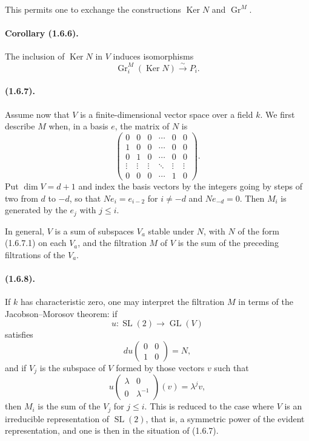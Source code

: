 \documentclass[11pt]{article}
\theoremstyle{remark}
\newcommand{\Gr}{\operatorname{Gr}}
\newcommand{\GL}{\operatorname{GL}}
\newcommand{\Ker}{\operatorname{Ker}}
\begin{document}
This permits one to exchange the constructions $\Ker N$ and $\Gr^M$.

\paragraph{Corollary (1.6.6).}
The inclusion of $\Ker N$ in $V$ induces isomorphisms
\[
\Gr^M_i(\Ker N)\xrightarrow{\sim} P_i.
\]

\paragraph{(1.6.7).}
Assume now that $V$ is a finite-dimensional vector space over a field $k$. We first describe $M$ when, in a basis $e$, the matrix of $N$ is
\begin{equation}\tag{1.6.7.1}
\begin{pmatrix}
0&0&0&\cdots&0&0\\
1&0&0&\cdots&0&0\\
0&1&0&\cdots&0&0\\
\vdots&\vdots&\vdots&\ddots&\vdots&\vdots\\
0&0&0&\cdots&1&0
\end{pmatrix}.
\end{equation}
Put $\dim V=d+1$ and index the basis vectors by the integers going by steps of two from $d$ to $-d$, so that $Ne_i=e_{i-2}$ for $i\ne -d$ and $Ne_{-d}=0$. Then $M_i$ is generated by the $e_j$ with $j\le i$.

In general, $V$ is a sum of subspaces $V_a$ stable under $N$, with $N$ of the form (1.6.7.1) on each $V_a$, and the filtration $M$ of $V$ is the sum of the preceding filtrations of the $V_a$.

\paragraph{(1.6.8).}
If $k$ has characteristic zero, one may interpret the filtration $M$ in terms of the Jacobson--Morosov theorem: if
\[
u:\operatorname{SL}(2)\longrightarrow \GL(V)
\]
satisfies
\[
du\begin{pmatrix}0&0\\1&0\end{pmatrix}=N,
\]
and if $V_j$ is the subspace of $V$ formed by those vectors $v$ such that
\[
u\begin{pmatrix}\lambda&0\\0&\lambda^{-1}\end{pmatrix}(v)=\lambda^j v,
\]
then $M_i$ is the sum of the $V_j$ for $j\le i$. This is reduced to the case where $V$ is an irreducible representation of $\operatorname{SL}(2)$, that is, a symmetric power of the evident representation, and one is then in the situation of (1.6.7).
\end{document}
